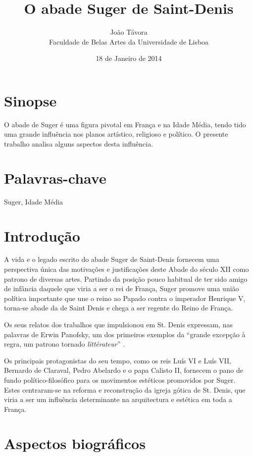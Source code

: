 \documentclass{article}
\title{O abade Suger de Saint-Denis}
\date{18 de Janeiro de 2014}
\author{João Távora \\Faculdade de Belas Artes da Universidade de Lisboa}
\begin{document}
\maketitle

\section{Sinopse}

O abade de Suger é uma figura pivotal em França e na Idade Média,
tendo tido uma grande influência nos planos artístico, religioso e
político. O presente trabalho analisa alguns aspectos desta
influência.

\section{Palavras-chave}

Suger, Idade Média

\section{Introdução}

A vida e o legado escrito do abade Suger de Saint-Denis fornecem uma
perspectiva única das motivações e justificações deste Abade do século
XII como patrono de diversas artes. Partindo da posição pouco habitual
de ter sido amigo de infância daquele que viria a ser o rei de França,
Suger promove uma união política importante que une o reino ao Papado
contra o imperador Henrique V, torna-se abade da de Saint Denis e
chega a ser regente do Reino de França.

Os seus relatos dos trabalhos que impulsionou em St. Denis expressam,
nas palavras de Erwin Panofsky, um dos primeiros exemplos da ``grande
excepção à regra, um patrono tornado \emph{littérateur}''
\cite{panofsky-suger}.

Os principais protagonistas do seu tempo, como os reis Luís VI e Luís
VII, Bernardo de Claraval, Pedro Abelardo e o papa Calisto II,
fornecem o pano de fundo político-filosófico para os movimentos
estéticos promovidos por Suger. Estes centraram-se na reforma e
reconstrução da igreja gótica de St. Denis, que viria a ser um
influência determinante na arquitectura e estética em toda a França.

\section{Aspectos biográficos}
\end{document}
